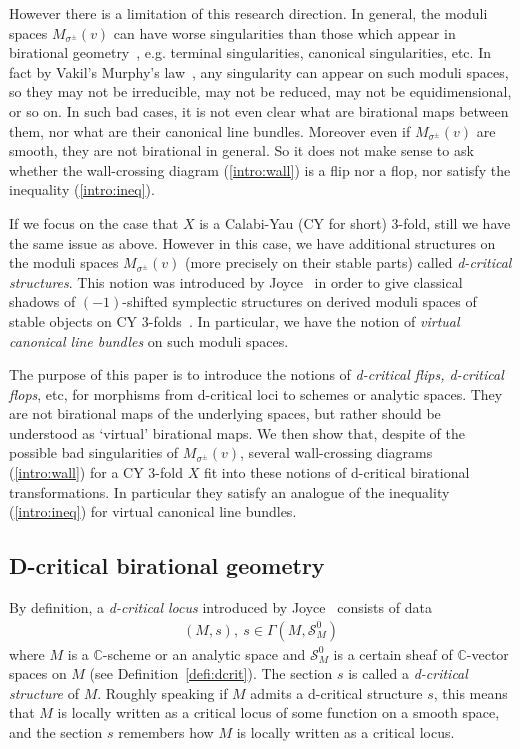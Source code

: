 \documentclass[11pt]{amsart}
\theoremstyle{plain}
\theoremstyle{definition}
\theoremstyle{remark}
\newcommand{\sS}{\mathcal{S}}
\begin{document}
However there is a limitation of this research direction. 
In general, the moduli spaces $M_{\sigma^{\pm}}(v)$ can have 
worse singularities than
those which appear in birational geometry~\cite{KM}, 
e.g. terminal singularities, canonical singularities, etc.
In fact by Vakil's Murphy's law~\cite{MR2227692}, 
any singularity can appear on such moduli
spaces, so 
they may not be irreducible, may not be reduced, may not be equidimensional, or so on. 
In such bad cases, it is not even clear what are birational 
maps between them, nor what are their canonical line bundles. 
Moreover even if $M_{\sigma^{\pm}}(v)$ are smooth, they are 
not birational in general. 
So it does not make sense to ask 
whether the 
wall-crossing diagram (\ref{intro:wall}) 
is a flip nor a flop, nor satisfy the inequality (\ref{intro:ineq}). 

If we focus on the case that $X$ is a
Calabi-Yau (CY for short) 3-fold, 
still we have the same issue
as above. 
However in this case, we have additional structures on the 
moduli spaces $M_{\sigma^{\pm}}(v)$ (more precisely on their stable parts) 
called \textit{d-critical structures}. 
This notion was introduced by Joyce~\cite{JoyceD}
in order to give 
classical shadows of $(-1)$-shifted symplectic structures
on derived moduli spaces of stable objects on CY 3-folds~\cite{PTVV}. 
In particular, we have the notion of \textit{virtual canonical line bundles}
on such moduli spaces.

The purpose of this paper is to introduce the notions of 
\textit{d-critical flips, d-critical flops}, etc, 
for morphisms from
d-critical loci 
to schemes or analytic spaces.
They are not birational maps 
of the underlying spaces, but 
rather should be understood as `virtual'
birational maps. 
We then show that, despite of the possible 
bad singularities of $M_{\sigma^{\pm}}(v)$,  
several wall-crossing diagrams (\ref{intro:wall}) 
for a CY 3-fold $X$ fit into these notions of d-critical 
birational transformations. In particular they satisfy 
an analogue of the inequality (\ref{intro:ineq}) for virtual 
canonical line bundles. 

\subsection{D-critical birational geometry}
By definition, a \textit{d-critical locus} introduced by Joyce~\cite{JoyceD}
 consists of data
\begin{align*}
(M, s), \ s \in \Gamma(M, \sS_{M}^0)
\end{align*} where 
$M$ is a $\mathbb{C}$-scheme or an analytic space and 
$\sS_M^0$ is a certain sheaf of $\mathbb{C}$-vector spaces
on $M$
(see Definition~\ref{defi:dcrit}). 
The section $s$ is called a \textit{d-critical structure} of $M$. 
Roughly speaking
if $M$ admits a d-critical structure $s$, 
this means that $M$ is locally written as a critical 
locus of some function on a smooth space, and the section 
$s$ remembers how $M$ is locally written as a critical locus. 
\end{document}
